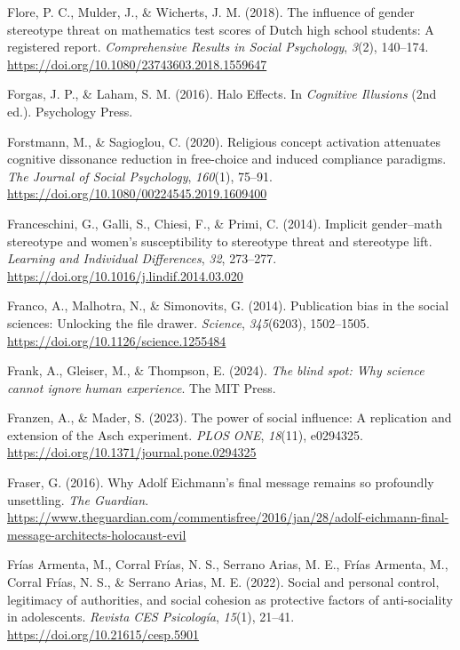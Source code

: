 \documentclass[
  letterpaper,
]{book}
\newlength{\cslhangindent}
\newenvironment{CSLReferences}[2] %
 {\begin{list}{}{%
  \setlength{\itemindent}{0pt}
  \setlength{\leftmargin}{0pt}
  \setlength{\parsep}{0pt}
  \ifodd #1
   \setlength{\leftmargin}{\cslhangindent}
   \setlength{\itemindent}{-1\cslhangindent}
  \fi
  \setlength{\itemsep}{#2\baselineskip}}}
 {\end{list}}
\begin{document}
\begin{CSLReferences}{1}{0}
Flore, P. C., Mulder, J., \& Wicherts, J. M. (2018). The influence of
gender stereotype threat on mathematics test scores of {Dutch} high
school students: A registered report. \emph{Comprehensive Results in
Social Psychology}, \emph{3}(2), 140--174.
\url{https://doi.org/10.1080/23743603.2018.1559647}

Forgas, J. P., \& Laham, S. M. (2016). Halo {Effects}. In
\emph{Cognitive {Illusions}} (2nd ed.). Psychology Press.

Forstmann, M., \& Sagioglou, C. (2020). Religious concept activation
attenuates cognitive dissonance reduction in free-choice and induced
compliance paradigms. \emph{The Journal of Social Psychology},
\emph{160}(1), 75--91.
\url{https://doi.org/10.1080/00224545.2019.1609400}

Franceschini, G., Galli, S., Chiesi, F., \& Primi, C. (2014). Implicit
gender--math stereotype and women's susceptibility to stereotype threat
and stereotype lift. \emph{Learning and Individual Differences},
\emph{32}, 273--277. \url{https://doi.org/10.1016/j.lindif.2014.03.020}

Franco, A., Malhotra, N., \& Simonovits, G. (2014). Publication bias in
the social sciences: {Unlocking} the file drawer. \emph{Science},
\emph{345}(6203), 1502--1505.
\url{https://doi.org/10.1126/science.1255484}

Frank, A., Gleiser, M., \& Thompson, E. (2024). \emph{The blind spot:
Why science cannot ignore human experience}. The MIT Press.

Franzen, A., \& Mader, S. (2023). The power of social influence: {A}
replication and extension of the {Asch} experiment. \emph{PLOS ONE},
\emph{18}(11), e0294325.
\url{https://doi.org/10.1371/journal.pone.0294325}

Fraser, G. (2016). Why {Adolf} {Eichmann}'s final message remains so
profoundly unsettling. \emph{The Guardian}.
\url{https://www.theguardian.com/commentisfree/2016/jan/28/adolf-eichmann-final-message-architects-holocaust-evil}

Frías Armenta, M., Corral Frías, N. S., Serrano Arias, M. E., Frías
Armenta, M., Corral Frías, N. S., \& Serrano Arias, M. E. (2022). Social
and personal control, legitimacy of authorities, and social cohesion as
protective factors of anti-sociality in adolescents. \emph{Revista CES
Psicología}, \emph{15}(1), 21--41.
\url{https://doi.org/10.21615/cesp.5901}


\end{CSLReferences}
\end{document}
